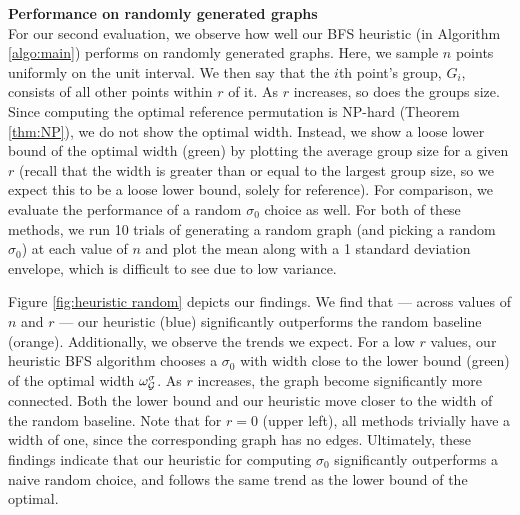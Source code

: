 \textbf{Performance on randomly generated graphs}\\
For our second evaluation, we observe how well our BFS heuristic (in Algorithm \ref{algo:main}) performs on randomly generated graphs. Here, we sample $n$ points uniformly on the unit interval. We then say that the $i$th point's group, $G_i$, consists of all other points within $r$ of it. As $r$ increases, so does the groups size. Since computing the optimal reference permutation is NP-hard (Theorem \ref{thm:NP}), we do not show the optimal width. Instead, we show a loose lower bound of the optimal width (green) by plotting the average group size for a given $r$ (recall that the width is greater than or equal to the largest group size, so we expect this to be a loose lower bound, solely for reference). For comparison, we evaluate the performance of a random $\sigma_0$ choice as well. For both of these methods, we run 10 trials of generating a random graph (and picking a random $\sigma_0$) at each value of $n$ and plot the mean along with a 1 standard deviation envelope, which is difficult to see due to low variance. 

Figure \ref{fig:heuristic random} depicts our findings. We find that --- across values of $n$ and $r$ --- our heuristic (blue) significantly outperforms the random baseline (orange). Additionally, we observe the trends we expect. For a low $r$ values, our heuristic BFS algorithm chooses a $\sigma_0$ with width close to the lower bound (green) of the optimal width $\omega_{\mathcal{G}}^\sigma$. As $r$ increases, the graph become significantly more connected. Both the lower bound and our heuristic move closer to the width of the random baseline. Note that for $r = 0$ (upper left), all methods trivially have a width of one, since the corresponding graph has no edges. Ultimately, these findings indicate that our heuristic for computing $\sigma_0$ significantly outperforms a naive random choice, and follows the same trend as the lower bound of the optimal. 